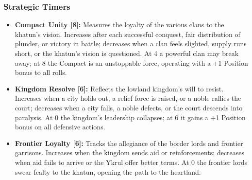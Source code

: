 \documentclass[11pt]{article}
\begin{document}
\subsubsection{Strategic Timers}
\begin{itemize}
\item \textbf{Compact Unity [8]:} Measures the loyalty of the various clans to the khatun's vision. Increases after each successful conquest, fair distribution of plunder, or victory in battle; decreases when a clan feels slighted, supply runs short, or the khatun's vision is questioned. At 4 a powerful clan may break away; at 8 the Compact is an unstoppable force, operating with a +1 Position bonus to all rolls.
\item \textbf{Kingdom Resolve [6]:} Reflects the lowland kingdom's will to resist. Increases when a city holds out, a relief force is raised, or a noble rallies the court; decreases when a city falls, a noble defects, or the court descends into paralysis. At 0 the kingdom's leadership collapses; at 6 it gains a +1 Position bonus on all defensive actions.
\item \textbf{Frontier Loyalty [6]:} Tracks the allegiance of the border lords and frontier garrisons. Increases when the kingdom sends aid or reinforcements; decreases when aid fails to arrive or the Ykrul offer better terms. At 0 the frontier lords swear fealty to the khatun, opening the path to the heartland.
\end{itemize}
\end{document}
